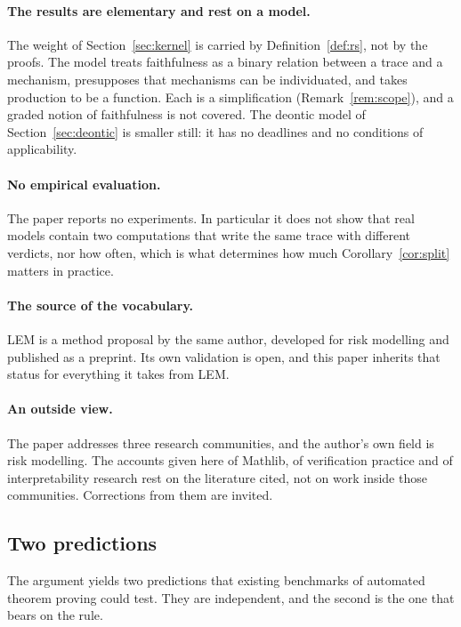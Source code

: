 \paragraph{The results are elementary and rest on a model.} The weight of
Section~\ref{sec:kernel} is carried by Definition~\ref{def:rs}, not by the proofs. The
model treats faithfulness as a binary relation between a trace and a mechanism,
presupposes that mechanisms can be individuated, and takes production to be a function.
Each is a simplification (Remark~\ref{rem:scope}), and a graded notion of faithfulness
is not covered. The deontic model of Section~\ref{sec:deontic} is smaller still: it has
no deadlines and no conditions of applicability.

\paragraph{No empirical evaluation.} The paper reports no experiments. In particular it
does not show that real models contain two computations that write the same trace with
different verdicts, nor how often, which is what determines how much
Corollary~\ref{cor:split} matters in practice.

\paragraph{The source of the vocabulary.} LEM is a method proposal by the same author,
developed for risk modelling and published as a preprint. Its own validation is open,
and this paper inherits that status for everything it takes from LEM.

\paragraph{An outside view.} The paper addresses three research communities, and the
author's own field is risk modelling. The accounts given here of Mathlib, of
verification practice and of interpretability research rest on the literature cited, not
on work inside those communities. Corrections from them are invited.

\subsection{Two predictions}

The argument yields two predictions that existing benchmarks of automated theorem
proving could test. They are independent, and the second is the one that bears on the
rule.

